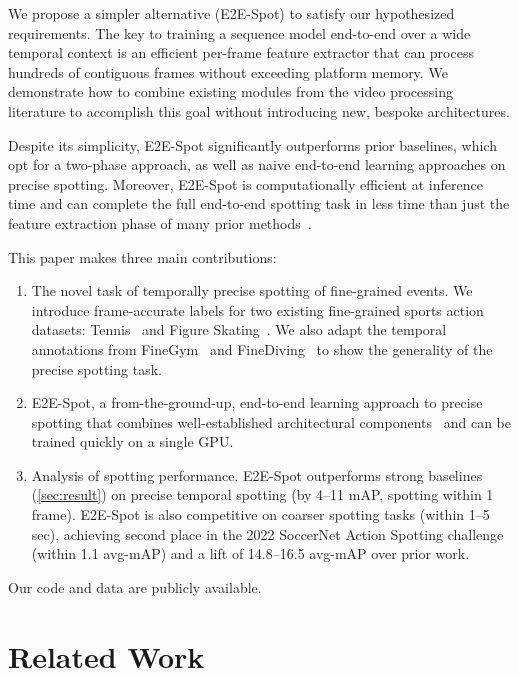 \documentclass[runningheads]{llncs}
\newcommand{\OURMETHOD}{{E2E-Spot}\xspace}
\begin{document}
We propose a simpler alternative (\OURMETHOD) to satisfy our hypothesized requirements.
The key to training a sequence model end-to-end over a wide temporal context is
an efficient per-frame feature extractor that can process hundreds of contiguous
frames without exceeding platform memory.
We demonstrate how to combine existing modules from the video processing literature to accomplish this goal without introducing new, bespoke architectures.

Despite its simplicity, \OURMETHOD significantly outperforms prior baselines, which opt for a two-phase approach, as well as naive end-to-end learning approaches on precise spotting.
Moreover, \OURMETHOD is computationally efficient at inference time
and can complete the full end-to-end spotting task in less time than just the
feature extraction phase of many prior methods~\cite{tsp,i3d}.

This paper makes three main contributions:
\begin{enumerate}
    \item The novel task of temporally precise spotting of fine-grained events.
We introduce frame-accurate labels for two existing fine-grained sports action datasets: Tennis~\cite{vid2player} and Figure Skating~\cite{vpd}.
We also adapt the temporal annotations from FineGym~\cite{finegym} and FineDiving~\cite{finediving} to show the generality of the precise spotting task.

    \item \OURMETHOD, a from-the-ground-up, end-to-end learning approach to
    precise spotting that combines well-established architectural
    components~\cite{gatedrnn,regnet,gsm} and can be trained quickly on a
    single GPU.

    \item Analysis of spotting performance.
\OURMETHOD outperforms strong baselines (\autoref{sec:result}) on precise temporal spotting (by 4--11 mAP, spotting within 1 frame).
\OURMETHOD is also competitive on coarser spotting tasks (within 1--5 sec), achieving second place in the 2022 SoccerNet Action Spotting challenge~\cite{soccernetv2,snspotting} (within 1.1 avg-mAP) and a lift of 14.8--16.5 avg-mAP over prior work.
\end{enumerate}

Our code and data are publicly available.
 
\section{Related Work}
\label{sec:related}
\end{document}
